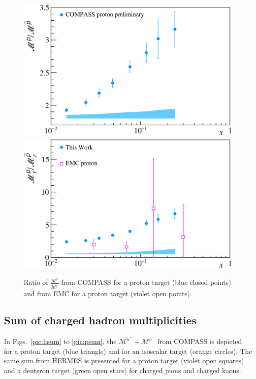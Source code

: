 \begin{figure}[!h]
  \centering
	\includegraphics[scale=0.48]{./gfx/Mult_p_ratio.eps}
	\includegraphics[scale=0.48]{./gfx/Mult_p_ratio_EMC.eps}
	\caption{Ratio of $\frac{\mathscr{M}^{p}}{\mathscr{M}^{\overline{p}}}$ from COMPASS for a proton target (blue closed points) and from EMC for a proton target (violet open points).}
	\label{pic:pratio}
\end{figure}

\subsection{Sum of charged hadron multiplicities}

In Figs.~\ref{pic:hsum} to \ref{pic:psum}, the $\mathscr{M}^{h^+}+\mathscr{M}^{h^-}$ from COMPASS is depicted for a proton target (blue triangle) and for an isoscalar target (orange circles). The same sum from HERMES is presented for a proton target (violet open squares) and a deuteron target (green open stars) for charged pions and charged kaons.

